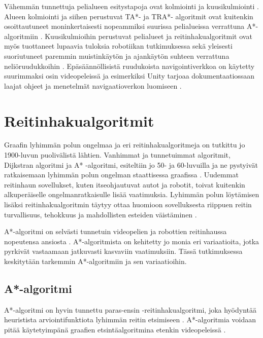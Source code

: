 \documentclass[utf8]{gradu3}
\begin{document}
Vähemmän tunnettuja pelialueen esitystapoja ovat kolmiointi ja kuusikulmiointi \parencite{abd2015comprehensive}. Alueen kolmiointi ja siihen perustuvat TA*- ja TRA*- algoritmit ovat kuitenkin osoittautuneet moninkertaisesti nopeammiksi suurissa pelialueissa verrattuna A*-algoritmiin \parencite{demyen2006efficient}. Kuusikulmioihin perustuvat pelialueet ja reitinhakualgoritmit ovat myös tuottaneet lupaavia tuloksia robotiikan tutkimuksessa sekä yleisesti suoriutuneet paremmin muistinkäytön ja ajankäytön suhteen verrattuna neliöruudukkoihin \parencite{abd2015comprehensive,lawande2022systematic}. Epäsäännöllisistä ruudukoista navigointiverkkoa on käytetty suurimmaksi osin videopeleissä ja esimerkiksi Unity tarjoaa dokumentaatiossaan laajat ohjeet ja menetelmät navigaatioverkon luomiseen \parencite{lawande2022systematic,unitydocnavmesh}.

\section{Reitinhakualgoritmit}

Graafin lyhimmän polun ongelmaa ja eri reitinhakualgoritmeja on tutkittu jo 1900-luvun puolivälistä lähtien. Vanhimmat ja tunnetuimmat algoritmit, Dijkstran algoritmi ja A* -algoritmi, esiteltiin jo 50- ja 60-luvuilla ja ne pystyivät ratkaisemaan lyhimmän polun ongelman staattisessa graafissa \parencite{dijkstra1959note,hart1968formal}. Uudemmat reitinhaun sovellukset, kuten itseohjautuvat autot ja robotit, toivat kuitenkin alkuperäiselle ongelmanratkaisulle lisää vaatimuksia. Lyhimmän polun löytämisen lisäksi reitinhakualgoritmin täytyy ottaa huomioon sovelluksesta riippuen reitin turvallisuus, tehokkuus ja mahdollisten esteiden väistäminen \parencite{karur2021survey}.

A*-algoritmi on selvästi tunnetuin videopelien ja robottien reitinhaussa nopeutensa ansiosta \parencite{abd2015comprehensive,botea2013pathfinding,cui2011based}. A*-algoritmista on kehitetty jo monia eri variaatioita, jotka pyrkivät vastaamaan jatkuvasti kasvaviin vaatimuksiin. Tässä tutkimuksessa keskitytään tarkemmin A*-algoritmiin ja sen variaatioihin.

\subsection{A*-algoritmi}

A*-algoritmi on hyvin tunnettu paras-ensin -reitinhakualgoritmi, joka hyödyntää heuristista arviointifunktiota lyhimmän reitin etsimiseen \parencite{cui2011based,duchovn2014path}. A*-algoritmia voidaan pitää käytetyimpänä graafien etsintäalgoritmina etenkin videopeleissä \parencite{botea2013pathfinding,lawande2022systematic}.
\end{document}
